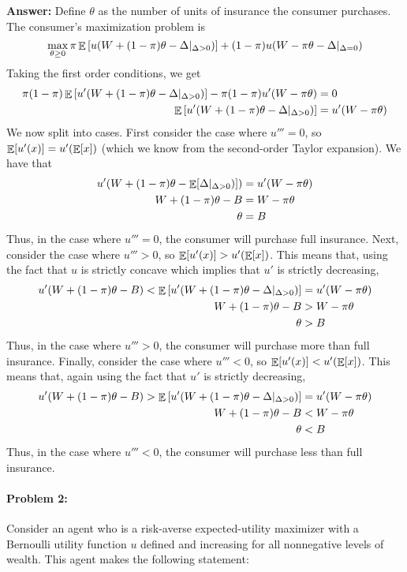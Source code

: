 \documentclass[12pt]{article}
\begin{document}
\textbf{Answer:} Define $\theta$ as the number of units of insurance the consumer purchases. The consumer's maximization problem is
\[
\max_{\theta \ge 0} \pi \mathop{\mathbb{E}}\left[u(W + (1-\pi)\theta - \Delta|_{\Delta > 0}) \right] + (1-\pi) u(W - \pi \theta - \Delta|_{\Delta = 0})
\]
Taking the first order conditions, we get
\begin{align*}
    \pi(1-\pi) \mathop{\mathbb{E}}\left[u'(W + (1-\pi)\theta - \Delta|_{\Delta > 0}) \right] - \pi(1-\pi) u'(W - \pi \theta) &= 0 \\
    \mathop{\mathbb{E}}\left[u'(W + (1-\pi)\theta - \Delta|_{\Delta > 0}) \right] &=  u'(W - \pi \theta)
\end{align*}
We now split into cases. First consider the case where $u''' = 0$, so $\mathop{\mathbb{E}}[u'(x)] = u'(\mathop{\mathbb{E}}[x])$ (which we know from the second-order Taylor expansion). We have that
\begin{align*}
    u'(W + (1-\pi)\theta - \mathop{\mathbb{E}}[\Delta|_{\Delta > 0})]) &= u'(W - \pi\theta) \\
    W + (1-\pi)\theta - B &= W - \pi\theta \\
    \theta &= B
\end{align*}
Thus, in the case where $u''' = 0$, the consumer will purchase full insurance. Next, consider the case where $u''' > 0$, so $\mathop{\mathbb{E}}[u'(x)] > u'(\mathop{\mathbb{E}}[x])$. This means that, using the fact that $u$ is strictly concave which implies that $u'$ is strictly decreasing,
\begin{align*}
    u'(W + (1-\pi)\theta - B) < \mathop{\mathbb{E}}\left[u'(W + (1-\pi)\theta - \Delta|_{\Delta > 0}) \right] &= u'(W - \pi\theta) \\
    W + (1-\pi)\theta - B &> W - \pi\theta \\
    \theta &> B
\end{align*}
Thus, in the case where $u''' > 0$, the consumer will purchase more than full insurance. Finally, consider the case where $u''' < 0$, so $\mathop{\mathbb{E}}[u'(x)] < u'(\mathop{\mathbb{E}}[x])$. This means that, again using the fact that $u'$ is strictly decreasing,
\begin{align*}
    u'(W + (1-\pi)\theta - B) > \mathop{\mathbb{E}}\left[u'(W + (1-\pi)\theta - \Delta|_{\Delta > 0}) \right] &= u'(W - \pi\theta) \\
    W + (1-\pi)\theta - B &< W - \pi\theta \\
    \theta &< B
\end{align*}
Thus, in the case where $u''' < 0$, the consumer will purchase less than full insurance.

\paragraph{Problem 2:} Consider an agent who is a risk-averse expected-utility maximizer with a Bernoulli utility function $u$ defined and increasing for all nonnegative levels of wealth. This agent makes the following statement:
\smallskip
\end{document}

